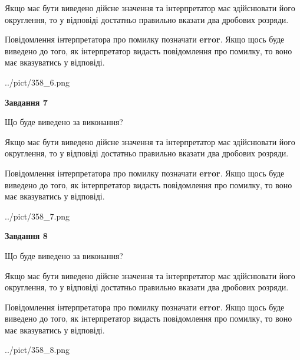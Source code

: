 \documentclass[12pt, ukrainian]{article}
\begin{document}
{\begin {Large}
Якщо має бути виведено дійсне значення та інтерпретатор має здійснювати його округлення, 
то у відповіді достатньо правильно вказати два дробових розряди.

Повідомлення інтерпретатора про помилку позначати \textbf{error}.
Якщо щось буде виведено до того, як інтерпретатор видасть повідомлення про помилку, 
то воно має вказуватись у відповіді. \par

\begin{center}
	{../pict/358_6.png}
\end{center}
\newpage

{\begin {center}\textbf{Завдання 7}\end {center}}\par
Що буде виведено за виконання? \par

Якщо має бути виведено дійсне значення та інтерпретатор має здійснювати його округлення, 
то у відповіді достатньо правильно вказати два дробових розряди.

Повідомлення інтерпретатора про помилку позначати \textbf{error}.
Якщо щось буде виведено до того, як інтерпретатор видасть повідомлення про помилку, 
то воно має вказуватись у відповіді. \par

\begin{center}
	{../pict/358_7.png}
\end{center}
\newpage

{\begin {center}\textbf{Завдання 8}\end {center}}\par
Що буде виведено за виконання? \par

Якщо має бути виведено дійсне значення та інтерпретатор має здійснювати його округлення, 
то у відповіді достатньо правильно вказати два дробових розряди.

Повідомлення інтерпретатора про помилку позначати \textbf{error}.
Якщо щось буде виведено до того, як інтерпретатор видасть повідомлення про помилку, 
то воно має вказуватись у відповіді. \par

\begin{center}
	{../pict/358_8.png}
\end{center}
\newpage


\end{Large}}
\end{document}
